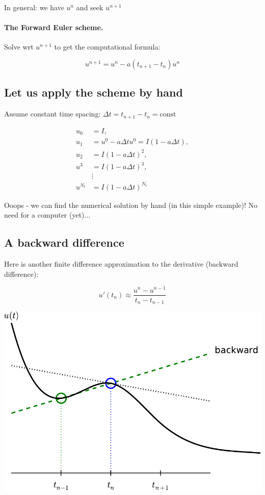 \documentclass[%
oneside,                 %
final,                   %
10pt]{article}
\begin{document}
\noindent
In general: we have $u^n$ and seek $u^{n+1}$


\paragraph{The Forward Euler scheme.}
Solve wrt $u^{n+1}$ to get the computational formula:

\begin{equation}
u^{n+1} = u^n - a(t_{n+1} -t_n)u^n
\label{decay:FE}
\end{equation}



\subsection*{Let us apply the scheme by hand}

Assume constant time spacing: $\Delta t = t_{n+1}-t_n=\mbox{const}$

\begin{align*}
u_0 &= I,\\ 
u_1 & = u^0 - a\Delta t u^0 = I(1-a\Delta t),\\ 
u_2 & = I(1-a\Delta t)^2,\\ 
u^3 &= I(1-a\Delta t)^3,\\ 
&\vdots\\ 
u^{N_t} &= I(1-a\Delta t)^{N_t}
\end{align*}

Ooops - we can find the numerical solution by hand (in this simple
example)! No need for a computer (yet)...

\subsection*{A backward difference}

Here is another finite difference approximation to the
derivative (backward difference):

\begin{equation}
u'(t_n) \approx \frac{u^{n}-u^{n-1}}{t_{n}-t_{n-1}}
\label{decay:BEdiff}
\end{equation}



\centerline{\includegraphics[width=0.8\linewidth]{fig-alg/fd_backward.pdf}}
\end{document}
